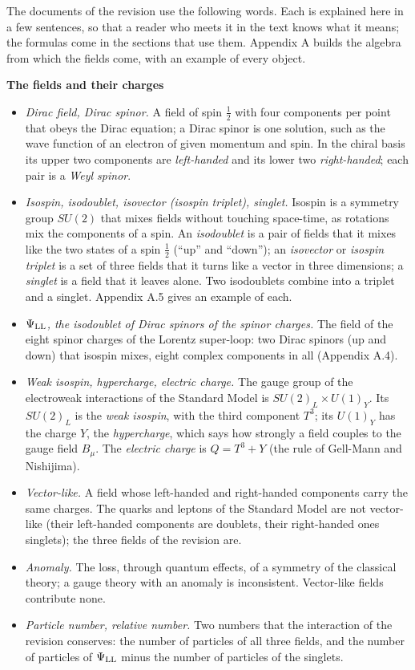 \documentclass[
  10pt,
]{article}
\providecommand{\tightlist}{%
  \setlength{\itemsep}{0pt}\setlength{\parskip}{0pt}}
\begin{document}
The documents of the revision use the following words. Each is explained
here in a few sentences, so that a reader who meets it in the text knows
what it means; the formulas come in the sections that use them. Appendix
A builds the algebra from which the fields come, with an example of
every object.

\textbf{The fields and their charges}

\begin{itemize}
\tightlist
\item
  \emph{Dirac field, Dirac spinor.} A field of spin \(\tfrac12\) with
  four components per point that obeys the Dirac equation; a Dirac
  spinor is one solution, such as the wave function of an electron of
  given momentum and spin. In the chiral basis its upper two components
  are \emph{left-handed} and its lower two \emph{right-handed}; each
  pair is a \emph{Weyl spinor}.
\item
  \emph{Isospin, isodoublet, isovector (isospin triplet), singlet.}
  Isospin is a symmetry group \(SU(2)\) that mixes fields without
  touching space-time, as rotations mix the components of a spin. An
  \emph{isodoublet} is a pair of fields that it mixes like the two
  states of a spin \(\tfrac12\) (``up'' and ``down''); an
  \emph{isovector} or \emph{isospin triplet} is a set of three fields
  that it turns like a vector in three dimensions; a \emph{singlet} is a
  field that it leaves alone. Two isodoublets combine into a triplet and
  a singlet. Appendix A.5 gives an example of each.
\item
  \emph{\(\Psi_{\rm LL}\), the isodoublet of Dirac spinors of the spinor
  charges.} The field of the eight spinor charges of the Lorentz
  super-loop: two Dirac spinors (up and down) that isospin mixes, eight
  complex components in all (Appendix A.4).
\item
  \emph{Weak isospin, hypercharge, electric charge.} The gauge group of
  the electroweak interactions of the Standard Model is
  \(SU(2)_L\times U(1)_Y\). Its \(SU(2)_L\) is the \emph{weak isospin},
  with the third component \(T^3\); its \(U(1)_Y\) has the charge \(Y\),
  the \emph{hypercharge}, which says how strongly a field couples to the
  gauge field \(B_\mu\). The \emph{electric charge} is \(Q=T^3+Y\) (the
  rule of Gell-Mann and Nishijima).
\item
  \emph{Vector-like.} A field whose left-handed and right-handed
  components carry the same charges. The quarks and leptons of the
  Standard Model are not vector-like (their left-handed components are
  doublets, their right-handed ones singlets); the three fields of the
  revision are.
\item
  \emph{Anomaly.} The loss, through quantum effects, of a symmetry of
  the classical theory; a gauge theory with an anomaly is inconsistent.
  Vector-like fields contribute none.
\item
  \emph{Particle number, relative number.} Two numbers that the
  interaction of the revision conserves: the number of particles of all
  three fields, and the number of particles of \(\Psi_{\rm LL}\) minus
  the number of particles of the singlets.
\end{itemize}
\end{document}
